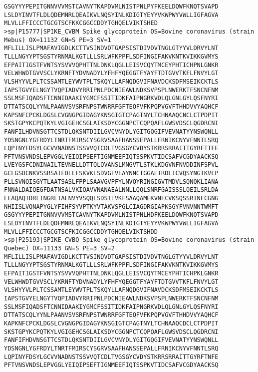 \begin{lstlisting}
GSGYYYPEPITGNNVVVMSTCAVNYTKAPDVMLNISTPNLPYFKEELDQWFKNQTSVAPD
LSLDYINVTFLDLQDEMNRLQEAIKVLNQSYINLKDIGTYEYYVKWPWYVWLLIGFAGVA
MLVLLFFICCCTGCGTSCFKKCGGCCDDYTGHQELVIKTSHED
>sp|P15777|SPIKE_CVBM Spike glycoprotein OS=Bovine coronavirus (strain Mebus) OX=11132 GN=S PE=3 SV=1
MFLILLISLPMAFAVIGDLKCTTVSINDVDTGAPSISTDIVDVTNGLGTYYVLDRVYLNT
TLLLNGYYPTSGSTYRNMALKGTLLLSRLWFKPPFLSDFINGIFAKVKNTKVIKKGVMYS
EFPAITIGSTFVNTSYSVVVQPHTTNLDNKLQGLLEISVCQYTMCEYPHTICHPNLGNKR
VELWHWDTGVVSCLYKRNFTYDVNADYLYFHFYQEGGTFYAYFTDTGVVTKFLFNVYLGT
VLSHYYVLPLTCSSAMTLEYWVTPLTSKQYLLAFNQDGVIFNAVDCKSDFMSEIKCKTLS
IAPSTGVYELNGYTVQPIADVYRRIPNLPDCNIEAWLNDKSVPSPLNWERKTFSNCNFNM
SSLMSFIQADSFTCNNIDAAKIYGMCFSSITIDKFAIPNGRKVDLQLGNLGYLQSFNYRI
DTTATSCQLYYNLPAANVSVSRFNPSTWNRRFGFTEQFVFKPQPVGVFTHHDVVYAQHCF
KAPSNFCPCKLDGSLCVGNGPGIDAGYKNSGIGTCPAGTNYLTCHNAAQCNCLCTPDPIT
SKSTGPYKCPQTKYLVGIGEHCSGLAIKSDYCGGNPCTCQPQAFLGWSVDSCLQGDRCNI
FANFILHDVNSGTTCSTDLQKSNTDIILGVCVNYDLYGITGQGIFVEVNATYYNSWQNLL
YDSNGNLYGFRDYLTNRTFMIRSCYSGRVSAAFHANSSEPALLFRNIKCNYVFNNTLSRQ
LQPINYFDSYLGCVVNADNSTSSVVQTCDLTVGSGYCVDYSTKRRSRRAITTGYRFTTFE
PFTVNSVNDSLEPVGGLYEIQIPSEFTIGNMEEFIQTSSPKVTIDCSAFVCGDYAACKSQ
LVEYGSFCDNINAILTEVNELLDTTQLQVANSLMNGVTLSTKLKDGVNFNVDDINFSPVL
GCLGSDCNKVSSRSAIEDLLFSKVKLSDVGFVEAYNNCTGGAEIRDLICVQSYNGIKVLP
PLLSVNQISGYTLAATSASLFPPLSAAVGVPFYLNVQYRINGIGVTMDVLSQNQKLIANA
FNNALDAIQEGFDATNSALVKIQAVVNANAEALNNLLQQLSNRFGAISSSLQEILSRLDA
LEAQAQIDRLINGRLTALNVYVSQQLSDSTLVKFSAAQAMEKVNECVKSQSSRINFCGNG
NHIISLVQNAPYGLYFIHFSYVPTKYVTAKVSPGLCIAGDRGIAPKSGYFVNVNNTWMFT
GSGYYYPEPITGNNVVVMSTCAVNYTKAPDVMLNISTPNLHDFKEELDQWFKNQTSVAPD
LSLDYINVTFLDLQDEMNRLQEAIKVLNQSYINLKDIGTYEYYVKWPWYVWLLIGFAGVA
MLVLLFFICCCTGCGTSCFKICGGCCDDYTGHQELVIKTSHDD
>sp|P25193|SPIKE_CVBQ Spike glycoprotein OS=Bovine coronavirus (strain Quebec) OX=11133 GN=S PE=3 SV=2
MFLILLISLPMAFAVIGDLKCTTVSINDVDTGAPSISTDIVDVTNGLGTYYVLDRVYLNT
TLLLNGYYPTSGSTYRNMALKGTLLLSRLWFKPPFLSDFINGIFAKVKNTKVIKKGVMYS
EFPAITIGSTFVNTSYSVVVQPHTTNLDNKLQGLLEISVCQYTMCEYPHTICHPKLGNKR
VELWHWDTGVVSCLYKRNFTYDVNADYLYFHFYQEGGTFYAYFTDTGVVTKFLFNVYLGT
VLSHYYVLPLTCSSAMTLEYWVTPLTSKQYLLAFNQDGVIFNAVDCKSDFMSEIKCKTLS
IAPSTGVYELNGYTVQPIADVYRRIPNLPDCNIEAWLNDKSVPSPLNWERKTFSNCNFNM
SSLMSFIQADSFTCNNIDAAKIYGMCFSSITIDKFAIPNGRKVDLQLGNLGYLQSFNYRI
DTTATSCQLYYNLPAANVSVSRFNPSTWNRRFGFTEQFVFKPQPVGVFTHHDVVYAQHCF
KAPKNFCPCKLDGSLCVGNGPGIDAGYKNSGIGTCPAGTNYLTCHNAAQCDCLCTPDPIT
SKSTGPYKCPQTKYLVGIGEHCSGLAIKSDYCGGNPCTCQPQAFLGWSVDSCLQGDRCNI
FANFIFHDVNSGTTCSTDLQKSNTDIILGVCVNYDLYGITGQGIFVEVNATYYNSWQNLL
YDSNGNLYGFRDYLTNRTFMIRSCYSGRVSAAFHANSSEPALLFRNIKCNYVFNNTLSRQ
LQPINYFDSYLGCVVNADNSTSSVVQTCDLTVGSGYCVDYSTKRRSRRAITTGYRFTNFE
PFTVNSVNDSLEPVGGLYEIQIPSEFTIGNMEEFIQTSSPKVTIDCSAFVCGDYAACKSQ

\end{lstlisting}
